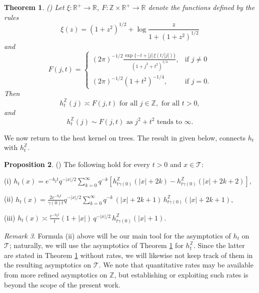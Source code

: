 \documentclass[10pt,a4paper]{amsart}
\renewcommand\mathcal{\mathscr}
\theoremstyle{plain}
\newtheorem{theorem}{Theorem}[section]
\theoremstyle{remark}
\newtheorem{remark}[theorem]{Remark}
\theoremstyle{definition}
\newtheorem{proposition}[theorem]{Proposition}
\begin{document}
	\begin{theorem}\label{thm:heat Z asym}(\cite[Theorem 2.3]{CMS})
		Let $\xi:\mathbb{R}^{+}\to \mathbb{R}$, $F:\mathbb{Z}\times \mathbb{R}^{+}\to \mathbb{R}$ denote the functions defined by the rules 
		$$\xi(z)=(1+z^2)^{1/2}+\log \frac{z}{1+(1+z^2)^{1/2}}$$
		and 
		$$F(j,t)=\begin{cases}
			(2\pi)^{-1/2}\frac{\exp\{-t+|j|\,\xi(t/|j|)\}}{(1+j^2+t^2)^{1/4}}, & \text{if } j\neq 0\\
			(2\pi)^{-1/2}(1+t^2)^{-1/4}, & \text{if } j=0.
		\end{cases}$$
		Then 
		$$h_t^{\mathbb{Z}}(j)\asymp F(j,t) \text{ for all } j\in \mathbb{Z}, \text{ for all } t>0,$$ and 
		$$h_t^{\mathbb{Z}}(j)\sim F(j,t) \text{ as } j^2+t^2 \text{ tends to } \infty.$$
	\end{theorem}
	
	
	
	
	We now return to the heat kernel on trees. The result in \cite{CMS} given below, connects $h_t$ with $h_t^{\mathbb{Z}}$.
	\begin{proposition}\label{heatkernel}(\cite[Proposition 2.5]{CMS})
		The following hold for every $t>0$ and $x\in \mathcal{T}$:
		
		(i) $h_t(x)=e^{-b_2t}q^{-|x|/2}\sum_{k=0}^{\infty}q^{-k}\left[h_{t\gamma(0)}^{\mathbb{Z}}(|x|+2k)-h_{t\gamma(0)}^{\mathbb{Z}}(|x|+2k+2)  \right],$
		
		(ii) $h_t(x)=\frac{2e^{-b_2t}}{\gamma(0)t}q^{-|x|/2}\sum_{k=0}^{\infty}q^{-k}\,(|x|+2k+1)\,h_{t\gamma(0)}^{\mathbb{Z}}(|x|+2k+1),$
		
		(iii) $h_t(x)\asymp \frac{e^{-b_2t}}{t}(1+|x|)\,q^{-|x|/2}\,h_{t\gamma(0)}^{\mathbb{Z}}(|x|+1).$
	\end{proposition}
\begin{remark}
    Formula (ii) above will be our main tool for the asymptotics of $h_t$ on $\mathcal{T}$; naturally, we will use the asymptotics of Theorem \ref{thm:heat Z asym} for $h_t^{\mathbb{Z}}$. Since the latter are stated in Theorem \ref{thm:heat Z asym} without rates, we will likewise not keep track of them in the resulting asymptotics on $\mathcal{T}$. We note that quantitative rates may be available from more refined asymptotics on $\mathbb{Z}$, but establishing or exploiting such rates is beyond the scope of the present work.
\end{remark}
    
\end{document}
